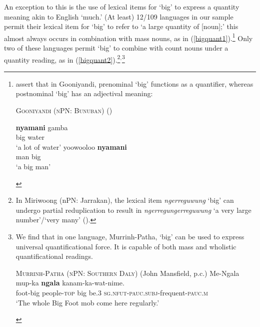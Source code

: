 \documentclass[12pt,egregdoesnotlikesansseriftitles]{scrartcl}
\begin{document}
An exception to this is the use of lexical items for `big' to express a quantity meaning akin to English `much.' (At least) 12/109 languages in our sample permit their lexical item for `big' to refer to `a large quantity of [noun];' this almost always occurs in combination with mass nouns, as in (\ref{bigquant1}).\footnote{\citet[37]{louagieverstraete16} assert that in Gooniyandi, prenominal `big' functions as a quantifier, whereas postnominal `big' has an adjectival meaning:
    \vspace{-2mm}
    \begin{exe}
      \ex  \textsc{Gooniyandi (nPN: Bunuban)} (\citealt{mcgregor90})
      \begin{xlist}
      \begin{multicols}{2}
        \ex \gll \textbf{nyamani} gamba\\
        big water \\
        \glt `a lot of water'%
        \ex \gll yoowooloo \textbf{nyamani} \\
        man big \\
        \glt `a big man' %
    \end{multicols}
      \end{xlist}
    \end{exe}
  } Only two of these languages permit `big' to combine with count nouns under a quantity reading, as in (\ref{bigquant2}).\footnote{
  In Miriwoong (nPN: Jarrakan), the lexical item \textit{ngerreguwung} `big' can undergo partial reduplication to result in \textit{ngerregungerreguwung} `a very large number'/`very many' (\citealt[43]{kofod78}).
  }$^{,}$\footnote{We find that in one language, Murrinh-Patha, `big' can be used to express universal quantificational force. It is capable of both mass and wholistic quantificational readings.
  
\begin{exe}
\ex  \textsc{Murrinh-Patha (nPN: Southern Daly)} (John Mansfield, p.c.)
\gll Me-Ngala mup-ka \textbf{ngala} kanam-ka-wat-nime.\\
foot-big people-\textsc{top} big be.3 \textsc{sg.nfut-pauc.subj}-frequent-\textsc{pauc.m}\\
`The whole Big Foot mob come here regularly.'
\end{exe}
}
\end{document}
